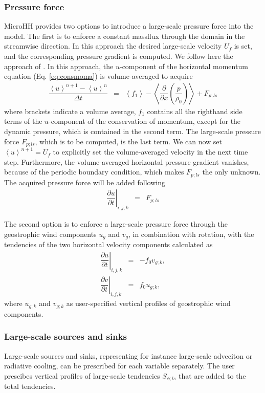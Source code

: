 \documentclass[gmd]{copernicus}
\begin{document}
\subsubsection{Pressure force}
MicroHH provides two options to introduce a large-scale pressure force into the model. The first is to enforce a constant massflux through the domain in the streamwise direction. In this approach the desired large-scale velocity $U_f$ is set, and the corresponding pressure gradient is computed. We follow here the approach of  \citet{vanReeuwijk2007}. In this approach, the $u$-component of the horizontal momentum equation (Eq. \ref{eq:consmoma}) is volume-averaged to acquire
\begin{eqnarray}
\dfrac{\left< u \right>^{n+1}  - \left< u \right>^{n}}{\Delta t} & = & \left< f_1 
\right> - \left< \dfrac{\partial}{\partial x} \left( \dfrac{p}{\rho_0} \right) \right>
+ F_{p;ls}
\end{eqnarray}
where brackets indicate a volume average, $f_1$ contains all the righthand side terms of the $u$-component of the conservation of momentum, except for the dynamic pressure, which is contained in the second term. The large-scale pressure force $F_{p;ls}$, which is to be computed, is the last term. We can now set $\left< u \right>^{n+1} = U_f$ to explicitly set the volume-averaged velocity in the next time step. Furthermore, the volume-averaged horizontal pressure gradient vanishes, because of the periodic boundary condition, which makes $F_{p;ls}$ the only unknown. The acquired pressure force will be added following
\begin{eqnarray}
\left. \dfrac{\partial u}{\partial t}\right|_{i,j,k} & = & F_{p;ls}
\end{eqnarray}

The second option is to enforce a large-scale pressure force through the geostrophic wind components $u_g$ and $v_g$, in combination with rotation, with the tendencies of the two horizontal velocity components calculated as
\begin{eqnarray}
\left. \dfrac{\partial u}{\partial t}\right|_{i,j,k} & = & -f_0 v_{g;k},\\
\left. \dfrac{\partial v}{\partial t}\right|_{i,j,k} & = &  f_0 u_{g;k},
\end{eqnarray}
where $u_{g;k}$ and $v_{g;k}$ as user-specified vertical profiles of geostrophic wind components.

\subsubsection{Large-scale sources and sinks}
Large-scale sources and sinks, representing for instance large-scale adveciton or radiative cooling, can be prescribed for each variable separately. The user prescibes vertical profiles of large-scale tendencies $S_{\phi;ls}$ that are added to the total tendencies.
\end{document}
